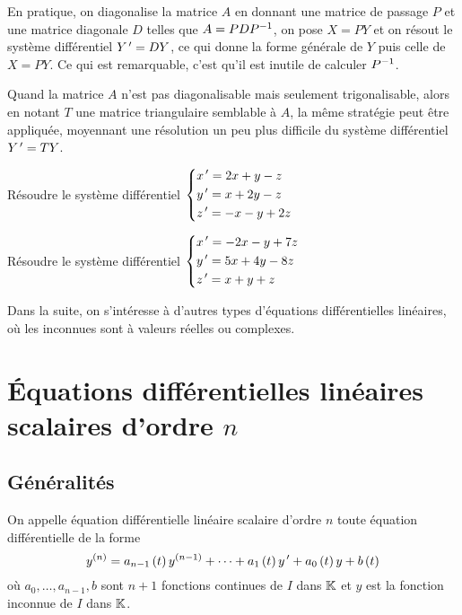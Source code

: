 En pratique, on diagonalise la matrice \(A\) en donnant une matrice de passage \(P\) et une matrice diagonale \(D\) telles que \(A=PDP^{-1}\), on pose \(X=PY\) et on résout le système différentiel \(Y^{\,\prime}=DY\), ce qui donne la forme générale de \(Y\) puis celle de \(X=PY\). Ce qui est remarquable, c'est qu'il est inutile de calculer \(P^{-1}\).

Quand la matrice \(A\) n'est pas diagonalisable mais seulement trigonalisable, alors en notant \(T\) une matrice triangulaire semblable à \(A\), la même stratégie peut être appliquée, moyennant une résolution un peu plus difficile du système différentiel \(Y^{\,\prime}=TY\).

\begin{exo}
Résoudre le système différentiel \(\begin{dcases}
x^{\,\prime}=2x+y-z \\
y^{\,\prime}=x+2y-z \\
z^{\,\prime}=-x-y+2z
\end{dcases}\)
\end{exo}

\begin{exo}
Résoudre le système différentiel \(\begin{dcases}
x^{\,\prime}=-2x-y+7z \\
y^{\,\prime}=5x+4y-8z \\
z^{\,\prime}=x+y+z
\end{dcases}\)
\end{exo}

Dans la suite, on s'intéresse à d'autres types d'équations différentielles linéaires, où les inconnues sont à valeurs réelles ou complexes.

\section{Équations différentielles linéaires scalaires d'ordre \(n\)}

\subsection{Généralités}

\begin{defi}
On appelle équation différentielle linéaire scalaire d'ordre \(n\) toute équation différentielle de la forme \[y^{\left(n\right)}=a_{n-1}\left(t\right)y^{\left(n-1\right)}+\dots+a_1\left(t\right)y^{\,\prime}+a_0\left(t\right)y+b\left(t\right)\] où \(a_0,\dots,a_{n-1},b\) sont \(n+1\) fonctions continues de \(I\) dans \(\mathbb{K}\) et \(y\) est la fonction inconnue de \(I\) dans \(\mathbb{K}\).
\end{defi}

